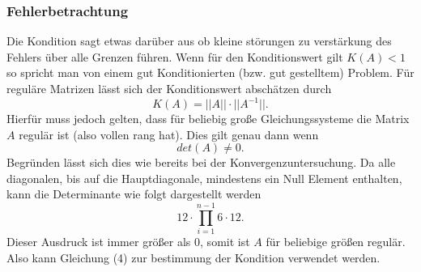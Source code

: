 \documentclass[12pt,titlepage]{article}
\newcommand{\norm}[1]{\lvert #1 \rvert}
\begin{document}
	 		\subsubsection{Fehlerbetrachtung}
				Die Kondition sagt etwas darüber aus ob kleine störungen zu verstärkung des Fehlers über alle Grenzen führen. Wenn für den Konditionswert gilt $K(A) < 1$ so spricht man von
				einem gut Konditionierten (bzw. gut gestelltem) Problem. Für reguläre Matrizen lässt sich der Konditionswert abschätzen durch
				\begin{equation}
					K(A) = \norm{\norm{A}}\cdot\norm{\norm{A^{-1}}}.
				\end{equation}
				Hierfür muss jedoch gelten, dass für beliebig große Gleichungssysteme die Matrix $A$ regulär ist (also vollen rang hat). Dies gilt genau dann wenn
				\begin{equation*}
					det(A) \neq 0.
				\end{equation*}
				\newpage
				Begründen lässt sich dies wie bereits bei der Konvergenzuntersuchung. Da alle diagonalen, bis auf die Hauptdiagonale, mindestens ein Null Element enthalten, kann
				die Determinante wie folgt dargestellt werden
				\begin{equation*}
					12\cdot\prod_{i=1}^{n-1}6 \cdot 12.
				\end{equation*}
				Dieser Ausdruck ist immer größer als $0$, somit ist $A$ für beliebige größen regulär. Also kann Gleichung (4) zur bestimmung der Kondition verwendet werden.
				
\end{document}
